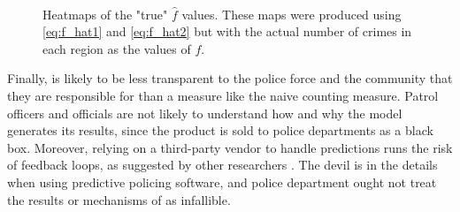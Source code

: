 \begin{figure}[bth]
    \myfloatalign
     \quad
     \\
    \caption{Heatmaps of the "true" $\hat{f}$ values. These maps were produced using \autoref{eq:f_hat1} and \autoref{eq:f_hat2} but with the actual number of crimes in each region as the values of $f$.}
    \label{fig:heatmaps_f_hat}
\end{figure}

Finally, \pp is likely to be less transparent to the police force and the community that they are responsible for than a measure like the naive counting measure. Patrol officers and officials are not likely to understand how and why the model generates its results, since the product is sold to police departments as a black box. Moreover, relying on a third-party vendor to handle predictions runs the risk of feedback loops, as suggested by other researchers \citep{lum_predict_2016,ensign_runaway_2017,ensign_decision_2018}. The devil is in the details when using predictive policing software, and police department ought not treat the results or mechanisms of \pp as infallible.
